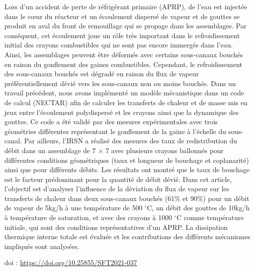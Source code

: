 {\normalsize
Lors d'un accident de perte de réfrigérant primaire (APRP), de l'eau est injectée dans le cœur du réacteur et un écoulement dispersé de vapeur et de gouttes se produit en aval du front de remouillage qui se propage dans les assemblages. Par conséquent, cet écoulement joue un rôle très important dans le refroidissement initial des crayons combustibles qui ne sont pas encore immergés dans l'eau. Ainsi, les assemblages peuvent être déformés avec certains sous-canaux bouchés en raison du gonflement des gaines combustibles. Cependant, le refroidissement des sous-canaux bouchés est dégradé en raison du flux de vapeur préférentiellement dévié vers les sous-canaux non ou moins bouchés. Dans un travail précédent, nous avons implémenté un modèle mécanistique dans un code de calcul (NECTAR) afin de calculer les transferts de chaleur et de masse mis en jeux entre l'écoulement polydispersé et les crayons ainsi que la dynamique des gouttes. Ce code a été validé par des mesures expérimentales avec trois géométries différentes représentant le gonflement de la gaine à l'échelle du sous-canal. Par ailleurs, l'IRSN a réalisé des mesures des taux de redistribution du débit dans un assemblage de 7 × 7 avec plusieurs crayons ballonnés pour différentes conditions géométriques (taux et longueur de bouchage et coplanarité) ainsi que pour différents débits. Les résultats ont montré que le taux de bouchage est le facteur prédominant pour la quantité de débit dévié. Dans cet article, l'objectif est d'analyser l'influence de la déviation du flux de vapeur sur les transferts de chaleur dans deux sous-canaux bouchés (61\% et 90\%) pour un débit de vapeur de 5kg/h à une température de 500 $^{\circ}$C, un débit des gouttes de 10kg/h à température de saturation, et avec des crayons à 1000 $^{\circ}$C comme température initiale, qui sont des conditions représentatives d'un APRP. La dissipation thermique interne totale est évaluée et les contributions des différents mécanismes impliqués sont analysées.

 \vfill doi : \url{https://doi.org/10.25855/SFT2021-037}

}
 
